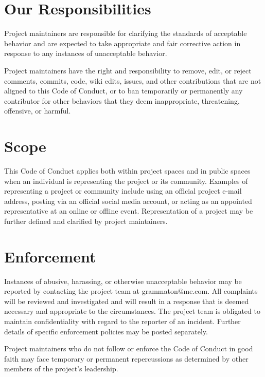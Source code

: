 \section*{Our Responsibilities}

  Project maintainers are responsible for clarifying the standards of acceptable
  behavior and are expected to take appropriate and fair corrective action in
  response to any instances of unacceptable behavior.

  Project maintainers have the right and responsibility to remove, edit, or
  reject comments, commits, code, wiki edits, issues, and other contributions
  that are not aligned to this Code of Conduct, or to ban temporarily or
  permanently any contributor for other behaviors that they deem inappropriate,
  threatening, offensive, or harmful.

 \section*{Scope}

  This Code of Conduct applies both within project spaces and in public spaces
  when an individual is representing the project or its community. Examples of
  representing a project or community include using an official project e-mail
  address, posting via an official social media account, or acting as an appointed
  representative at an online or offline event. Representation of a project may be
  further defined and clarified by project maintainers.

 \section*{Enforcement}

  Instances of abusive, harassing, or otherwise unacceptable behavior may be
  reported by contacting the project team at grammaton@me.com. All
  complaints will be reviewed and investigated and will result in a response that
  is deemed necessary and appropriate to the circumstances. The project team is
  obligated to maintain confidentiality with regard to the reporter of an incident.
  Further details of specific enforcement policies may be posted separately.

  Project maintainers who do not follow or enforce the Code of Conduct in good
  faith may face temporary or permanent repercussions as determined by other
  members of the project's leadership.

\clearpage

